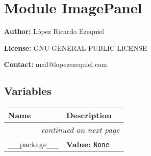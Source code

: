 %
%
%


\section{Module ImagePanel}

    \label{ImagePanel}
\textbf{Author:} López Ricardo Ezequiel



\textbf{License:} GNU GENERAL PUBLIC LICENSE



\textbf{Contact:} mail@lopezezequiel.com





  \subsection{Variables}

    \vspace{-1cm}
\hspace{\varindent}\begin{longtable}{|p{\varnamewidth}|p{\vardescrwidth}|l}
\cline{1-2}
\cline{1-2} \centering \textbf{Name} & \centering \textbf{Description}& \\
\cline{1-2}
\endhead\cline{1-2}\multicolumn{3}{r}{\small\textit{continued on next page}}\\\endfoot\cline{1-2}
\endlastfoot\raggedright \_\-\_\-p\-a\-c\-k\-a\-g\-e\-\_\-\_\- & \raggedright \textbf{Value:} 
{\tt None}&\\
\cline{1-2}
\end{longtable}



